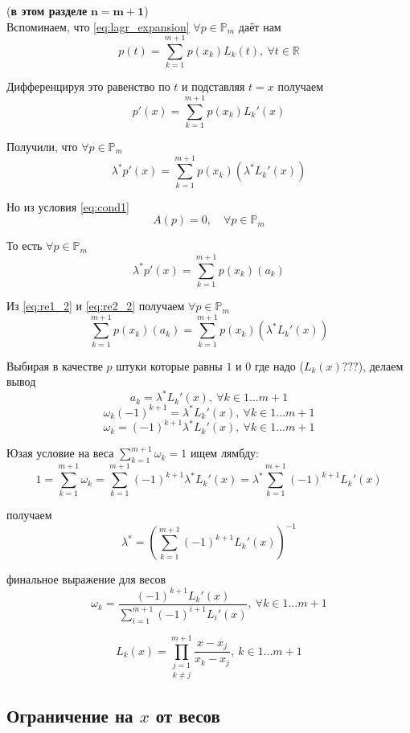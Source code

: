 \documentclass[12pt,a4paper]{article}
\begin{document}
	
	\noindent (\textbf{в этом разделе} $\mathbf{n = m+1}$)\\ 
	
	
	\noindent Вспоминаем, что \eqref{eq:lagr_expansion}  $\forall p \in \mathbb{P}_m$ даёт нам
	\[
	p(t) = 
	\sum_{k=1}^{m+1} p(x_k) L_k(t), \  \forall t \in \mathbb{R}
	\]
	
	\noindent Дифференцируя это равенство по $t$ и подставляя $t=x$ получаем 
	\[
	p'(x) = 
	\sum_{k=1}^{m+1} p(x_k) L_k'(x)
	\]
	
	
	\noindent Получили, что $\forall p \in \mathbb{P}_m$
	\begin{equation}
		\lambda^* p'(x) = 
		\sum_{k=1}^{m+1} p(x_k) ( \lambda^* L_k'(x) ) 
		\label{eq:re1_2}
	\end{equation}
	
	\noindent Но из условия \eqref{eq:cond1} 
	\[
	A(p) = 0, \quad \forall p \in \mathbb{P}_m
	\]
	
	\noindent То есть $\forall p \in \mathbb{P}_m$
	\begin{equation}
		\lambda^* p'(x) = 
		\sum_{k=1}^{m+1} p(x_k) ( a_k ) 
		\label{eq:re2_2}
	\end{equation}
	
	\noindent Из \eqref{eq:re1_2} и \eqref{eq:re2_2} получаем $\forall p \in \mathbb{P}_m$
	\[
	\sum_{k=1}^{m+1} p(x_k) ( a_k ) = \sum_{k=1}^{m+1} p(x_k) ( \lambda^* L_k'(x) ) 
	\] 
	
	\noindent Выбирая в качестве $p$ штуки которые равны $1$ и $0$ где надо ($L_k(x) ???$), делаем вывод
	\[
	a_k = \lambda^* L_k'(x), \ \forall k \in 1 \ldots m+1 
	\]
	\[
	\omega_k (-1)^{k+1} = \lambda^* L_k'(x), \ \forall k \in 1 \ldots m+1 
	\]
	\[
	\omega_k  = (-1)^{k+1} \lambda^* L_k'(x), \ \forall k \in 1 \ldots m+1 
	\]
	
	
	\noindent Юзая условие на веса $\sum_{k=1}^{m+1} \omega_k = 1$ ищем лямбду:
	\[
	1 = \sum_{k=1}^{m+1} \omega_k = \sum_{k=1}^{m+1} (-1)^{k+1} \lambda^* L_k'(x) = \lambda^* \sum_{k=1}^{m+1} (-1)^{k+1}  L_k'(x)
	\]
	
	\noindent получаем
	\[
	\lambda^* = \left( \sum_{k=1}^{m+1} (-1)^{k+1}  L_k'(x) \right) ^ {-1}
	\]
	
	\noindent финальное выражение для весов
	\[
	\omega_k  = 
	\frac
	{
		(-1)^{k+1} L_k'(x)
	}
	{
		\sum_{i=1}^{m+1} (-1)^{i+1}  L_i'(x)
	}, \ \forall k \in 1 \ldots m+1 
	\]
	
	\[
	L_k(x) = \underset{k \neq j}{\prod_{j=1}^{m+1}} \frac{x - x_j}{x_k - x_j}, \ k \in 1 \ldots m+1
	\]
	
	\subsection{Ограничение на $x$ от весов}
	
\end{document}
